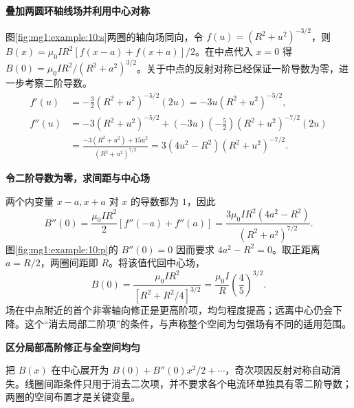 \begin{solution}\textbf{叠加两圆环轴线场并利用中心对称}\par\nobreak
图\ref{fig:mg1:example:10:s}两圈的轴向场同向，令 $f(u)=(R^2+u^2)^{-3/2}$，则 $B(x)=\mu_0IR^2[f(x-a)+f(x+a)]/2$。在中点代入 $x=0$ 得 $B(0)=\mu_0IR^2/(R^2+a^2)^{3/2}$。关于中点的反射对称已经保证一阶导数为零，进一步考察二阶导数。
\[
\begin{aligned}
 f'(u)&=-\frac32(R^2+u^2)^{-5/2}(2u)
       =-3u(R^2+u^2)^{-5/2},\\
 f''(u)&=-3(R^2+u^2)^{-5/2}
       +(-3u)\left(-\frac52\right)(R^2+u^2)^{-7/2}(2u)\\
       &=\frac{-3(R^2+u^2)+15u^2}{(R^2+u^2)^{7/2}}
       =3(4u^2-R^2)(R^2+u^2)^{-7/2}.
\end{aligned}
\]



\par\medskip{}\noindent\textbf{令二阶导数为零，求间距与中心场}\par\nobreak
两个内变量 $x-a,x+a$ 对 $x$ 的导数都为 $1$，因此
\[
 B''(0)=\frac{\mu_0IR^2}{2}[f''(-a)+f''(a)]
 =\frac{3\mu_0IR^2(4a^2-R^2)}{(R^2+a^2)^{7/2}}.
\]
图\ref{fig:mg1:example:10:p}的 $B''(0)=0$ 因而要求 $4a^2-R^2=0$。取正距离 $a=R/2$，两圈间距即 $R$。将该值代回中心场，
\[
 B(0)=\frac{\mu_0IR^2}{[R^2+R^2/4]^{3/2}}
 =\frac{\mu_0I}{R}\left(\frac45\right)^{3/2}.
\]
场在中点附近的首个非零轴向修正是更高阶项，均匀程度提高；远离中心仍会下降。这个“消去局部二阶项”的条件，与声称整个空间为匀强场有不同的适用范围。



\par\medskip{}\noindent\textbf{区分局部高阶修正与全空间均匀}\par\nobreak
把 $B(x)$ 在中心展开为 $B(0)+B''(0)x^2/2+\cdots$，奇次项因反射对称自动消失。线圈间距条件只用于消去二次项，并不要求各个电流环单独具有零二阶导数；两圈的空间布置才是关键变量。\end{solution}
